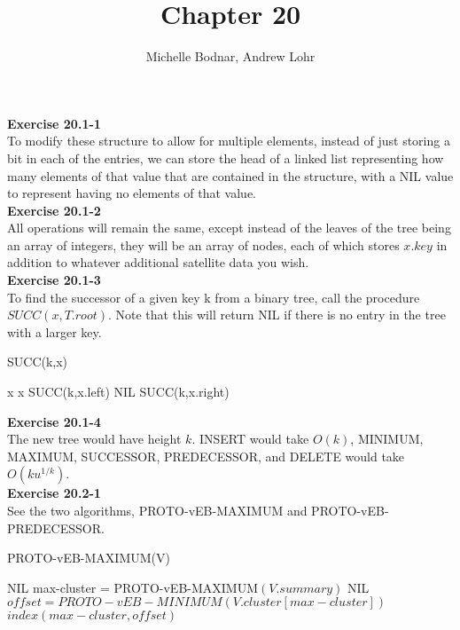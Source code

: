 \documentclass{article}
\title{Chapter 20}
\author{Michelle Bodnar, Andrew Lohr}
\begin{document}
\maketitle


\noindent\textbf{Exercise 20.1-1}\\

To modify these structure to allow for multiple elements, instead of just storing a bit in each of the entries, we can store the head of a linked list representing how many elements of that value that are contained in the structure, with a NIL value to represent having no elements of that value.\\

\noindent\textbf{Exercise 20.1-2}\\

All operations will remain the same, except instead of the leaves of the tree being an array of integers, they will be an array of nodes, each of which stores $x.key$ in addition to whatever additional satellite data you wish.  \\


\noindent\textbf{Exercise 20.1-3}\\

To find the successor of a given key k from a binary tree, call the procedure $SUCC(x, T.root)$. Note that this will return NIL if there is no entry in the tree with a larger key.\\
\begin{algorithm}
\caption{ SUCC(k,x)}
\begin{algorithmic}
		\State \Return x
	\Else
			\State \Return x
		\Else 
			\State \Return SUCC(k,x.left)
		\EndIf
	\EndIf
\Else
		\State \Return NIL
	\Else
		\State \Return SUCC(k,x.right)
	\EndIf
\EndIf
\end{algorithmic}
\end{algorithm}


\noindent\textbf{Exercise 20.1-4}\\

The new tree would have height $k$.  INSERT would take $O(k)$, MINIMUM, MAXIMUM, SUCCESSOR, PREDECESSOR, and DELETE would take $O(ku^{1/k})$. \\

\noindent\textbf{Exercise 20.2-1}\\

See the two algorithms, PROTO-vEB-MAXIMUM and PROTO-vEB-PREDECESSOR.
\begin{algorithm}
\caption{PROTO-vEB-MAXIMUM(V)}
\begin{algorithmic}
\State {}
\State {}
\Else
\State \Return NIL
\EndIf
\Else
\State max-cluster = PROTO-vEB-MAXIMUM$(V.summary)$
\State \Return NIL
\Else
\State $offset =  PROTO-vEB-MINIMUM(V.cluster[max-cluster])$
\State \Return $index(max-cluster,offset)$
\EndIf
\EndIf
\end{algorithmic}
\end{algorithm}
\end{document}
